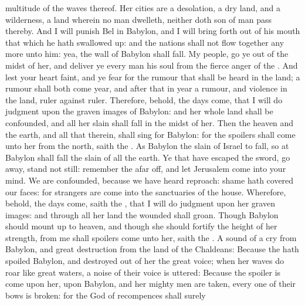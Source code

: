 {multitude of the
waves thereof.
Her
cities are a
desolation, a
dry
land, and a
wilderness, a
land wherein no
man
dwelleth, neither doth
{}
son of
man
pass
thereby.
And I will
punish
Bel in
Babylon, and I will bring
forth out of his
mouth that which he hath swallowed
up: and the
nations shall not flow
together any more unto him: yea, the
wall of
Babylon shall
fall.
My
people, go ye
out of the
midst of her, and
deliver ye every
man his
soul from the
fierce
anger of the
{}.
And lest your
heart
faint, and ye
fear for the
rumour that shall be
heard in the
land; a
rumour shall both
come
{}
year, and
after that in
{}
year
{} a
rumour, and
violence in the
land,
ruler against
ruler.
Therefore, behold, the
days
come, that I will do
judgment upon the graven
images of
Babylon: and her whole
land shall be
confounded, and all her
slain shall
fall in the
midst of her.
Then the
heaven and the
earth, and all that
{} therein, shall
sing for
Babylon: for the
spoilers shall
come unto her from the
north,
saith the
{}.
As
Babylon
{} the
slain of
Israel to
fall, so at
Babylon shall
fall the
slain of all the
earth.
Ye that have
escaped the
sword, go
away, stand not
still:
remember the
{} afar
off, and let
Jerusalem
come into your
mind.
We are
confounded, because we have
heard
reproach:
shame hath
covered our
faces: for
strangers are
come into the
sanctuaries of the
{}
house.
Wherefore, behold, the
days
come,
saith the
{}, that I will do
judgment upon her graven
images: and through all her
land the
wounded shall
groan.
Though
Babylon should mount
up to
heaven, and though she should
fortify the
height of her
strength,
{} from me shall
spoilers
come unto her,
saith the
{}.
A
sound of a
cry
{} from
Babylon, and
great
destruction from the
land of the
Chaldeans:
Because the
{} hath
spoiled
Babylon, and
destroyed out of her the
great
voice; when her
waves do
roar like
great
waters, a
noise of their
voice is
uttered:
Because the
spoiler is
come upon her,
{} upon
Babylon, and her mighty
men are
taken, every one of their
bows is
broken: for the
{}
God of
recompences shall
surely
}
